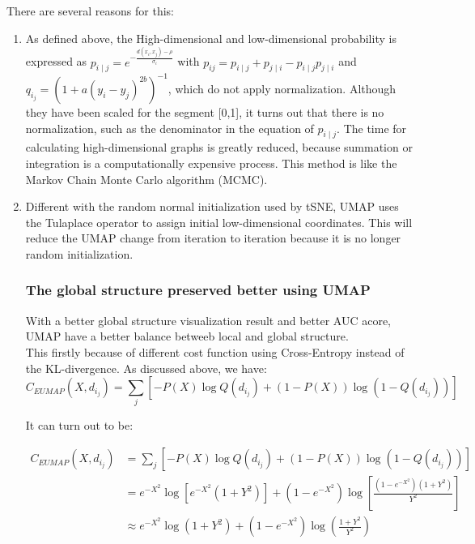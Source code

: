 There are several reasons for this:
\begin{enumerate}[1)]

\item As defined above, the High-dimensional and low-dimensional probability is expressed as $p_{i \mid j} = e^{-\frac{d(x_i,x_j) - \rho}{\sigma_i}}$ with $p_{ij} = p_{i\mid j} + p_{j\mid i} - p_{i\mid j}p_{j\mid i}$ and 
${q_i_j} = (1 + a(y_i - y_j)^{2b} )^{-1}$, which do not apply normalization. Although they have been scaled for the segment [0,1], it turns out that there is no normalization, such as the denominator in the equation of $p_{i \mid j}$. The time for calculating high-dimensional graphs is greatly reduced, because summation or integration is a computationally expensive process. This method is like the Markov Chain Monte Carlo algorithm (MCMC). \\

\item Different with the random normal initialization used by tSNE, UMAP uses the Tulaplace operator to assign initial low-dimensional coordinates. This will reduce the UMAP change from iteration to iteration because it is no longer random initialization.\\
   
\subsubsection{The global structure preserved better using UMAP}

With a better global structure visualization result and better AUC acore, UMAP have a better balance betweeb local and global structure.\\

This firstly because of different cost function using Cross-Entropy instead of the KL-divergence. As discussed above, we have:
\begin{equation*}
    C_{EUMAP}(X,d_i_j) = \sum _{j}[-P(X) \log Q(d_i_j) + (1 - P(X)) \log (1-Q(d_i_j))]
\end{equation*}

It can turn out to be:

\begin{equation*}
\begin{aligned}
C_{EUMAP}(X,d_i_j)  &= \sum _{j}[-P(X) \log Q(d_i_j) + (1 - P(X)) \log (1-Q(d_i_j))]\\
&= e^{-X^2} \log \left[ e^{-X^2} (1 + Y^2) \right] + (1 - e^{-X^2}) \log \left[ \frac{ (1 - e^{-X^2})(1 + Y^2)}{Y^2}\right]\\
&\approx e^{-X^2} \log (1 + Y^2) + (1 - e^{-X^2}) \log (\frac{1 + Y^2}{Y^2})
\end{aligned}
\end{equation*}


\end{enumerate}
